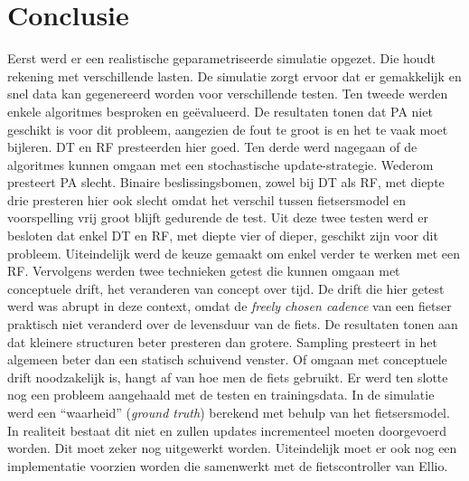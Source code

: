 \chapter{Conclusie}
Eerst werd er een realistische geparametriseerde simulatie opgezet. Die houdt rekening met verschillende lasten. De simulatie zorgt ervoor dat er gemakkelijk en snel data kan gegenereerd worden voor verschillende testen. Ten tweede werden enkele algoritmes besproken en geëvalueerd. De resultaten tonen dat PA niet geschikt is voor dit probleem, aangezien de fout te groot is en het te vaak moet bijleren. DT en RF presteerden hier goed. Ten derde werd nagegaan of de algoritmes kunnen omgaan met een stochastische update-strategie. Wederom presteert PA slecht. Binaire beslissingsbomen, zowel bij DT als RF, met diepte drie presteren hier ook slecht omdat het verschil tussen fietsersmodel en voorspelling vrij groot blijft gedurende de test. Uit deze twee testen werd er besloten dat enkel DT en RF, met diepte vier of dieper, geschikt zijn voor dit probleem. Uiteindelijk werd de keuze gemaakt om enkel verder te werken met een RF. Vervolgens werden twee technieken getest die kunnen omgaan met conceptuele drift, het veranderen van concept over tijd. De drift die hier getest werd was abrupt in deze context, omdat de \textit{freely chosen cadence} van een fietser praktisch niet veranderd over de levensduur van de fiets. De resultaten tonen aan dat kleinere structuren beter presteren dan grotere. Sampling presteert in het algemeen beter dan een statisch schuivend venster. Of omgaan met conceptuele drift noodzakelijk is, hangt af van hoe men de fiets gebruikt. Er werd ten slotte nog een probleem aangehaald met de testen en trainingsdata. In de simulatie werd een “waarheid” (\textit{ground truth}) berekend met behulp van het fietsersmodel. In realiteit bestaat dit niet en zullen updates incrementeel moeten doorgevoerd worden. Dit moet zeker nog uitgewerkt worden. Uiteindelijk moet er ook nog een implementatie voorzien worden die samenwerkt met de fietscontroller van Ellio.